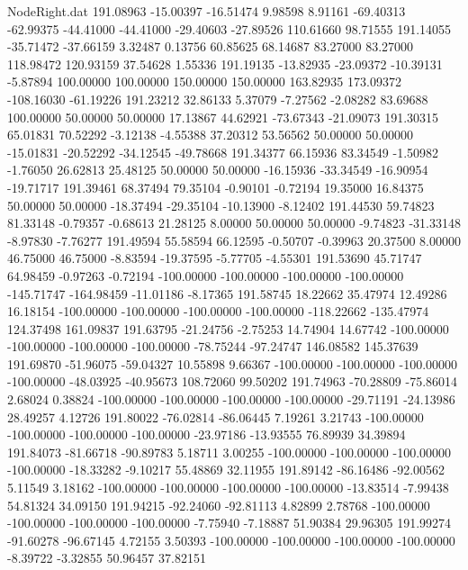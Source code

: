 \begin{filecontents}{NodeRight.dat}
 191.08963  -15.00397  -16.51474     9.98598    8.91161  -69.40313  -62.99375  -44.41000  -44.41000  -29.40603  -27.89526  110.61660   98.71555
 191.14055  -35.71472  -37.66159     3.32487    0.13756   60.85625   68.14687   83.27000   83.27000  118.98472  120.93159   37.54628    1.55336
 191.19135  -13.82935  -23.09372   -10.39131   -5.87894  100.00000  100.00000  150.00000  150.00000  163.82935  173.09372 -108.16030  -61.19226
 191.23212   32.86133    5.37079    -7.27562   -2.08282   83.69688  100.00000   50.00000   50.00000   17.13867   44.62921  -73.67343  -21.09073
 191.30315   65.01831   70.52292    -3.12138   -4.55388   37.20312   53.56562   50.00000   50.00000  -15.01831  -20.52292  -34.12545  -49.78668
 191.34377   66.15936   83.34549    -1.50982   -1.76050   26.62813   25.48125   50.00000   50.00000  -16.15936  -33.34549  -16.90954  -19.71717
 191.39461   68.37494   79.35104    -0.90101   -0.72194   19.35000   16.84375   50.00000   50.00000  -18.37494  -29.35104  -10.13900   -8.12402
 191.44530   59.74823   81.33148    -0.79357   -0.68613   21.28125    8.00000   50.00000   50.00000   -9.74823  -31.33148   -8.97830   -7.76277
 191.49594   55.58594   66.12595    -0.50707   -0.39963   20.37500    8.00000   46.75000   46.75000   -8.83594  -19.37595   -5.77705   -4.55301
 191.53690   45.71747   64.98459    -0.97263   -0.72194 -100.00000 -100.00000 -100.00000 -100.00000 -145.71747 -164.98459  -11.01186   -8.17365
 191.58745   18.22662   35.47974    12.49286   16.18154 -100.00000 -100.00000 -100.00000 -100.00000 -118.22662 -135.47974  124.37498  161.09837
 191.63795  -21.24756   -2.75253    14.74904   14.67742 -100.00000 -100.00000 -100.00000 -100.00000  -78.75244  -97.24747  146.08582  145.37639
 191.69870  -51.96075  -59.04327    10.55898    9.66367 -100.00000 -100.00000 -100.00000 -100.00000  -48.03925  -40.95673  108.72060   99.50202
 191.74963  -70.28809  -75.86014     2.68024    0.38824 -100.00000 -100.00000 -100.00000 -100.00000  -29.71191  -24.13986   28.49257    4.12726
 191.80022  -76.02814  -86.06445     7.19261    3.21743 -100.00000 -100.00000 -100.00000 -100.00000  -23.97186  -13.93555   76.89939   34.39894
 191.84073  -81.66718  -90.89783     5.18711    3.00255 -100.00000 -100.00000 -100.00000 -100.00000  -18.33282   -9.10217   55.48869   32.11955
 191.89142  -86.16486  -92.00562     5.11549    3.18162 -100.00000 -100.00000 -100.00000 -100.00000  -13.83514   -7.99438   54.81324   34.09150
 191.94215  -92.24060  -92.81113     4.82899    2.78768 -100.00000 -100.00000 -100.00000 -100.00000   -7.75940   -7.18887   51.90384   29.96305
 191.99274  -91.60278  -96.67145     4.72155    3.50393 -100.00000 -100.00000 -100.00000 -100.00000   -8.39722   -3.32855   50.96457   37.82151

\end{filecontents}
